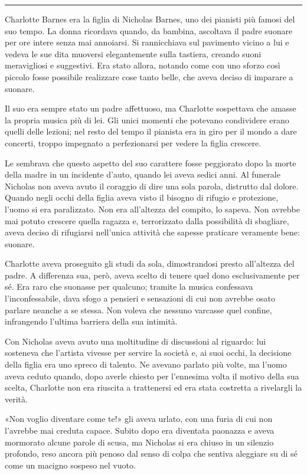 \documentclass[a4paper,oneside,10pt]{memoir}
\begin{document}
\plainbreak{1}

Charlotte Barnes era la figlia di Nicholas Barnes, uno dei pianisti più famosi del suo tempo. La donna ricordava
quando, da bambina, ascoltava il padre suonare per ore intere senza mai annoiarsi. Si rannicchiava sul pavimento vicino
a lui e vedeva le sue dita muoversi elegantemente sulla tastiera, creando suoni meravigliosi e suggestivi. Era stato
allora, notando come con uno sforzo così piccolo fosse possibile realizzare cose tanto belle, che aveva deciso di
imparare a suonare.

Il suo era sempre stato un padre affettuoso, ma Charlotte sospettava che amasse la propria musica più di lei. Gli unici
momenti che potevano condividere erano quelli delle lezioni; nel resto del tempo il pianista era in giro per il mondo a
dare concerti, troppo impegnato a perfezionarsi per vedere la figlia crescere.

Le sembrava che questo aspetto del suo carattere fosse peggiorato dopo la morte della madre in un incidente d'auto,
quando lei aveva sedici anni. Al funerale Nicholas non aveva avuto il coraggio di dire una sola parola, distrutto dal
dolore. Quando negli occhi della figlia aveva visto il bisogno di rifugio e protezione, l'uomo si era paralizzato. Non
era all'altezza del compito, lo sapeva. Non avrebbe mai potuto crescere quella ragazza e, terrorizzato dalla
possibilità di sbagliare, aveva deciso di rifugiarsi nell'unica attività che sapesse praticare veramente bene:
suonare.

Charlotte aveva proseguito gli studi da sola, dimostrandosi presto all'altezza del padre. A differenza sua, però, aveva
scelto di tenere quel dono esclusivamente per sé. Era raro che suonasse per qualcuno; tramite la musica confessava
l'inconfessabile, dava sfogo a pensieri e sensazioni di cui non avrebbe osato parlare neanche a se stessa. Non voleva
che nessuno varcasse quel confine, infrangendo l'ultima barriera della sua intimità.

Con Nicholas aveva avuto una moltitudine di discussioni al riguardo: lui sosteneva che l'artista vivesse per servire la
società e, ai suoi occhi, la decisione della figlia era uno spreco di talento. Ne avevano parlato più volte, ma l'uomo
aveva ceduto quando, dopo averle chiesto per l'ennesima volta il motivo della sua scelta, Charlotte non era riuscita a
trattenersi ed era stata costretta a rivelargli la verità.

«Non voglio diventare come te!» gli aveva urlato, con una furia di cui non l'avrebbe mai creduta capace. Subito dopo
era diventata paonazza e aveva mormorato alcune parole di scusa, ma Nicholas si era chiuso in un silenzio profondo, reso
ancora più penoso dal senso di colpa che sentiva aleggiare su di sé come un macigno sospeso nel vuoto.
\end{document}
